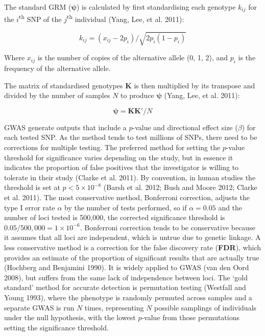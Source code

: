 \documentclass[
]{book}
\begin{document}
The standard GRM (\(\pmb{\psi}\)) is calculated by first standardising each genotype \(k_{ij}\) for the \(i\)\textsuperscript{th} SNP of the \(j\)\textsuperscript{th} individual (Yang, Lee, et al. 2011):

\begin{equation}
k_{ij} = (x_{ij} - 2p_i)/\sqrt{2p_i(1-p_i)} \label{eq:grmstd}
\end{equation}

Where \(x_{ij}\) is the number of copies of the alternative allele (0, 1, 2), and \(p_i\) is the frequency of the alternative allele.

The matrix of standardised genotypes \(\textbf{K}\) is then multiplied by its transpose and divided by the number of samples \(N\) to produce \(\pmb{\psi}\) (Yang, Lee, et al. 2011):

\begin{equation}
\pmb{\psi} = \textbf{K}\textbf{K}'/ N \label{eq:grm}
\end{equation}

GWAS generate outputs that include a \(p\)-value and directional effect size (\(\beta\)) for each tested SNP. As the method tends to test millions of SNPs, there need to be corrections for multiple testing. The preferred method for setting the \(p\)-value threshold for significance varies depending on the study, but in essence it indicates the proportion of false positives that the investigator is willing to tolerate in their study (Clarke et al. 2011). By convention, in human studies the threshold is set at \(p < 5 \times 10^{-8}\) (Barsh et al. 2012; Bush and Moore 2012; Clarke et al. 2011). The most conservative method, Bonferroni correction, adjusts the type I error rate \(\alpha\) by the number of tests performed, so if \(\alpha = 0.05\) and the number of loci tested is 500,000, the corrected significance threshold is \(0.05 / 500,000 = 1\times10^{-6}\). Bonferroni correction tends to be conservative because it assumes that all loci are independent, which is untrue due to genetic linkage. A less conservative method is a correction for the false discovery rate (\textbf{FDR}), which provides an estimate of the proportion of significant results that are actually true (Hochberg and Benjamini 1990). It is widely applied to GWAS (van den Oord 2008), but suffers from the same lack of independence between loci. The `gold standard' method for accurate detection is permutation testing (Westfall and Young 1993), where the phenotype is randomly permuted across samples and a separate GWAS is run \(N\) times, representing \(N\) possible samplings of individuals under the null hypothesis, with the lowest \(p\)-value from those permutations setting the significance threshold.
\end{document}
